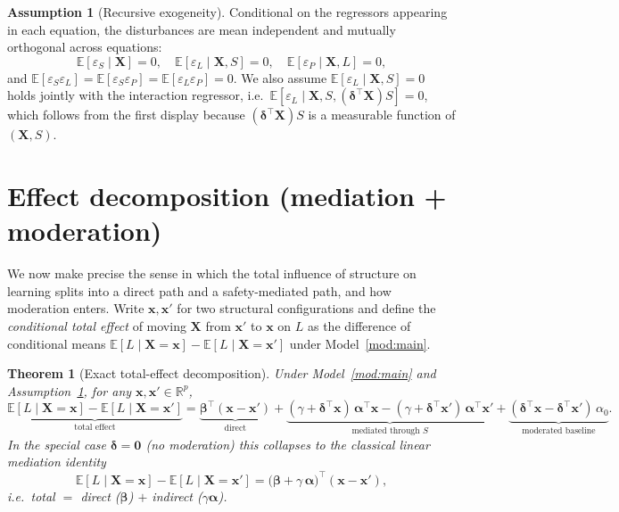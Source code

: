 \documentclass{amsart}
\theoremstyle{definition}
\newtheorem{assumption}{Assumption}
\theoremstyle{plain}
\newtheorem{theorem}{Theorem}
\begin{document}
\begin{assumption}[Recursive exogeneity]\label{ass:exog}
Conditional on the regressors appearing in each equation, the disturbances are mean
independent and mutually orthogonal across equations:
\[
\mathbb E[\varepsilon_S\mid \bm X]=0,\quad
\mathbb E[\varepsilon_L\mid \bm X,S]=0,\quad
\mathbb E[\varepsilon_P\mid \bm X,L]=0,
\]
and $\mathbb E[\varepsilon_S\varepsilon_L]=\mathbb E[\varepsilon_S\varepsilon_P]
=\mathbb E[\varepsilon_L\varepsilon_P]=0$. We also assume
$\mathbb E[\varepsilon_L\mid \bm X,S]=0$ holds jointly with the interaction regressor,
i.e.\ $\mathbb E[\varepsilon_L\mid \bm X,S,(\bm\delta^\top\bm X)S]=0$, which follows from
the first display because $(\bm\delta^\top\bm X)S$ is a measurable function of $(\bm X,S)$.
\end{assumption}

\section{Effect decomposition (mediation + moderation)}

We now make precise the sense in which the total influence of structure on learning splits
into a direct path and a safety-mediated path, and how moderation enters. Write
$\bm x,\bm x'$ for two structural configurations and define the \emph{conditional total
effect} of moving $\bm X$ from $\bm x'$ to $\bm x$ on $L$ as the difference of conditional
means $\mathbb E[L\mid \bm X=\bm x]-\mathbb E[L\mid \bm X=\bm x']$ under
Model~\ref{mod:main}.

\begin{theorem}[Exact total-effect decomposition]\label{thm:decomp}
Under Model~\ref{mod:main} and Assumption~\ref{ass:exog}, for any $\bm x,\bm x'\in\mathbb
R^p$,
\begin{equation}\label{eq:decomp}
\underbrace{\mathbb E[L\mid \bm X=\bm x]-\mathbb E[L\mid \bm X=\bm x']}_{\text{total effect}}
=\underbrace{\bm\beta^\top(\bm x-\bm x')}_{\text{direct}}
+\underbrace{(\gamma+\bm\delta^\top\bm x)\,\bm\alpha^\top\bm x
   -(\gamma+\bm\delta^\top\bm x')\,\bm\alpha^\top\bm x'}_{\text{mediated through }S}
+\underbrace{(\bm\delta^\top\bm x-\bm\delta^\top\bm x')\,\alpha_0}_{\text{moderated baseline}}.
\end{equation}
In the special case $\bm\delta=\bm 0$ (no moderation) this collapses to the classical linear
mediation identity
\begin{equation}\label{eq:classmed}
\mathbb E[L\mid \bm X=\bm x]-\mathbb E[L\mid \bm X=\bm x']
=\bigl(\bm\beta+\gamma\,\bm\alpha\bigr)^\top(\bm x-\bm x'),
\end{equation}
i.e.\ \emph{total} $=$ \emph{direct} ($\bm\beta$) $+$ \emph{indirect} ($\gamma\bm\alpha$).
\end{theorem}
\end{document}
